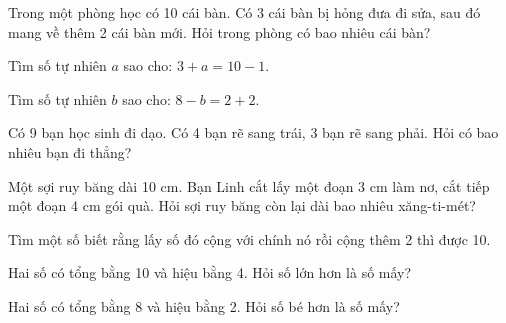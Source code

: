 \begin{ex}
Trong một phòng học có 10 cái bàn. Có 3 cái bàn bị hỏng đưa đi sửa, sau đó mang về thêm 2 cái bàn mới. Hỏi trong phòng có bao nhiêu cái bàn?
\end{ex}

\begin{ex}
Tìm số tự nhiên $a$ sao cho: $3 + a = 10 - 1$.
\end{ex}

\begin{ex}
Tìm số tự nhiên $b$ sao cho: $8 - b = 2 + 2$.
\end{ex}

\begin{ex}
Có 9 bạn học sinh đi dạo. Có 4 bạn rẽ sang trái, 3 bạn rẽ sang phải. Hỏi có bao nhiêu bạn đi thẳng?
\end{ex}

\begin{ex}
Một sợi ruy băng dài 10 cm. Bạn Linh cắt lấy một đoạn 3 cm làm nơ, cắt tiếp một đoạn 4 cm gói quà. Hỏi sợi ruy băng còn lại dài bao nhiêu xăng-ti-mét?
\end{ex}

\begin{ex}
Tìm một số biết rằng lấy số đó cộng với chính nó rồi cộng thêm 2 thì được 10.
\end{ex}

\begin{ex}
Hai số có tổng bằng 10 và hiệu bằng 4. Hỏi số lớn hơn là số mấy?
\end{ex}

\begin{ex}
Hai số có tổng bằng 8 và hiệu bằng 2. Hỏi số bé hơn là số mấy?
\end{ex}

